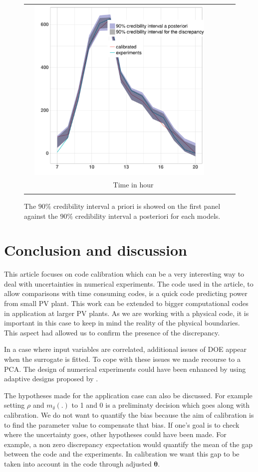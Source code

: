 \documentclass[soumission]{jsfds}
\begin{document}
\begin{figure}[htbp!]
\begin{center}
\begin{tabular}{cccccc}
    & \includegraphics[width=.17\textwidth]{figR/model4Output.pdf}
    \\
    & \multicolumn{5}{c}{Time in hour}\\
	&&\\
  \end{tabular}   
\caption{The $90\%$ credibility interval a priori is showed on the first panel against the $90\%$ credibility interval a posteriori for each models.}
\label{fig:interestCalibration}
\end{center}
\end{figure}


\section{Conclusion and discussion}

This article focuses on code calibration which can be a very interesting way to deal with uncertainties in numerical experiments. The code used in the article, to allow comparisons with time consuming codes, is a quick code predicting power from small PV plant. This work can be extended to bigger computational codes in application at larger PV plants. As we are working with a physical code, it is important in this case to keep in mind the reality of the physical boundaries. This aspect had allowed us to confirm the presence of the discrepancy.\newline

In a case where input variables are correlated, additional issues of DOE appear when the surrogate is fitted. To cope with these issues we made recourse to a PCA. The design of numerical experiments could have been enhanced by using adaptive designs proposed by \citet{damblin2018}. \newline

The hypotheses made for the application case can also be discussed. For example setting $\rho$ and $m_{\delta}(.)$ to 1 and 0 is a preliminaty decision which goes along with calibration. We do not want to quantify the bias because the aim of calibration is to find the parameter value to compensate that bias. If one's goal is to check where the uncertainty goes, other hypotheses could have been made. For example, a non zero discrepancy expectation would quantify the mean of the gap between the code and the experiments. In calibration we want this gap to be taken into account in the code through adjusted $\boldsymbol{\theta}$.\newline
\end{document}
